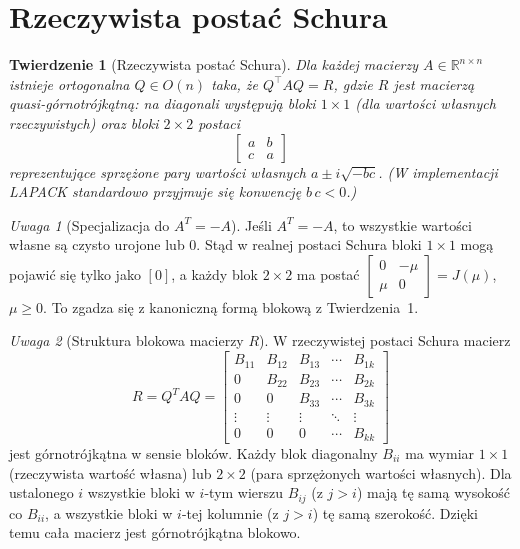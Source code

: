\documentclass[12pt]{article}
\theoremstyle{plain}
\newtheorem{theorem}{Twierdzenie}
\theoremstyle{remark}
\newtheorem*{remark}{Uwaga}
\begin{document}
\section{Rzeczywista postać  Schura}

\begin{theorem}[Rzeczywista postać Schura]
Dla każdej macierzy $A\in\mathbb{R}^{n\times n}$ istnieje ortogonalna $Q\in O(n)$ taka, że
$Q^\top A Q = R$, gdzie $R$ jest macierzą quasi-górnotrójkątną:
na diagonali występują bloki $1\times1$ (dla wartości własnych rzeczywistych)
oraz bloki $2\times2$ postaci
\[
\begin{bmatrix} a & b\\ c & a\end{bmatrix}
\]
reprezentujące sprzężone pary wartości własnych $a \pm i\sqrt{-bc}$.
(W implementacji LAPACK standardowo przyjmuje się konwencję $b\,c<0$.)
\end{theorem}


\begin{remark}[Specjalizacja do $A^T=-A$]
Jeśli $A^T=-A$, to wszystkie wartości własne są czysto urojone lub $0$. 
Stąd w realnej postaci Schura bloki $1\times1$ mogą pojawić się tylko jako $[0]$, 
a każdy blok $2\times2$ ma postać $ \begin{bmatrix} 0 & -\mu\\ \mu & 0\end{bmatrix}=J(\mu)$, $\mu\ge 0$.
To zgadza się z kanoniczną formą blokową z Twierdzenia~1.
\end{remark}

\begin{remark}[Struktura blokowa macierzy $R$]
W rzeczywistej postaci Schura macierz
\[
R = Q^TAQ =
\begin{bmatrix}
B_{11} & B_{12} & B_{13} & \cdots & B_{1k} \\
0      & B_{22} & B_{23} & \cdots & B_{2k} \\
0      & 0      & B_{33} & \cdots & B_{3k} \\
\vdots & \vdots & \vdots & \ddots & \vdots \\
0      & 0      & 0      & \cdots & B_{kk}
\end{bmatrix}
\]
jest górnotrójkątna w sensie bloków.
Każdy blok diagonalny $B_{ii}$ ma wymiar $1\times 1$ (rzeczywista wartość własna)
lub $2\times 2$ (para sprzężonych wartości własnych). 
Dla ustalonego $i$ wszystkie bloki w $i$-tym wierszu $B_{ij}$ (z $j>i$) 
mają tę samą wysokość co $B_{ii}$, a wszystkie bloki w $i$-tej kolumnie (z $j>i$) 
tę samą szerokość. Dzięki temu cała macierz jest górnotrójkątna blokowo.
\end{remark}
\end{document}
